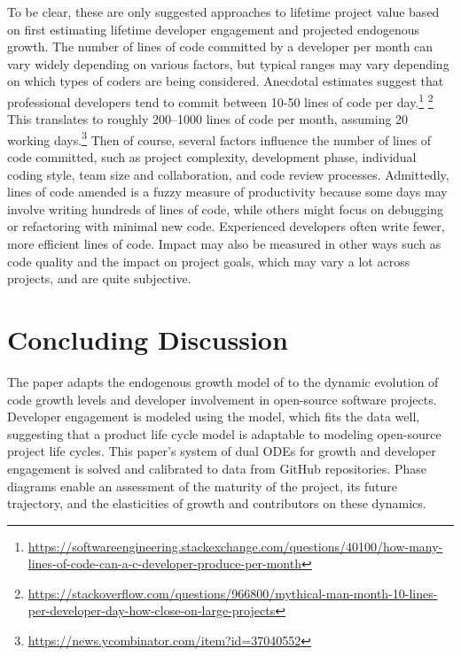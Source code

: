 \documentclass[conference]{IEEEtran}
\begin{document}
To be clear, these are only suggested approaches to lifetime project value based on first estimating lifetime developer engagement and projected endogenous growth. The number of lines of code committed by a developer per month can vary widely depending on various factors, but typical ranges may vary depending on which types of coders are being considered. Anecdotal estimates suggest that professional developers tend to commit between 10-50 lines of code per day.\footnote{\url{https://softwareengineering.stackexchange.com/questions/40100/how-many-lines-of-code-can-a-c-developer-produce-per-month}} \footnote{ \url{https://stackoverflow.com/questions/966800/mythical-man-month-10-lines-per-developer-day-how-close-on-large-projects}} This translates to roughly 200--1000 lines of code per month, assuming 20 working days.\footnote{\url{https://news.ycombinator.com/item?id=37040552}} Then of course, several factors influence the number of lines of code committed, such as project complexity, development phase, individual coding style, team size and collaboration, and code review processes. Admittedly, lines of code amended is a fuzzy measure of productivity because some days may involve writing hundreds of lines of code, while others might focus on debugging or refactoring with minimal new code. Experienced developers often write fewer, more efficient lines of code. Impact may also be measured in other ways such as code quality and the impact on project goals, which may vary a lot across projects, and are quite subjective. 


 
\section{Concluding Discussion}
\label{sec:conclusions}

The paper adapts the endogenous growth model of \cite{romer_endogenous_1990} to the dynamic evolution of code growth levels and developer involvement in open-source software projects. Developer engagement is modeled using the \cite{bass_new_1969} model, which fits the data well, suggesting that a product life cycle model is adaptable to modeling open-source project life cycles. This paper's  system of dual ODEs for growth and developer engagement is solved and calibrated to data from GitHub repositories. Phase diagrams enable an assessment of the maturity of the project, its future trajectory, and the elasticities of growth and contributors on these dynamics. 
\end{document}
